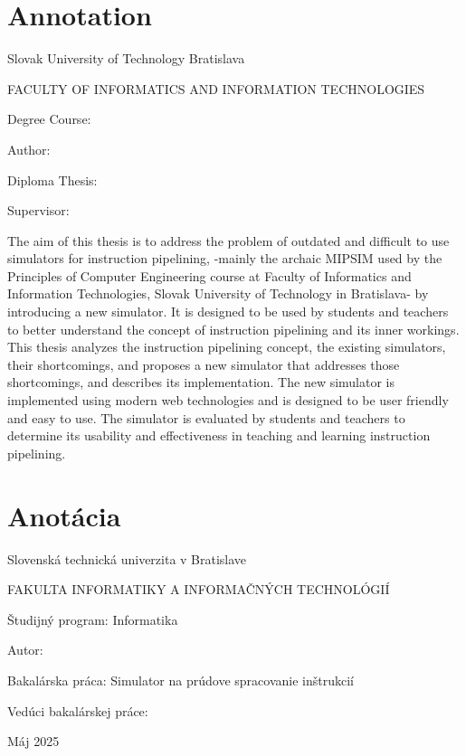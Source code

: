 \thispagestyle{empty}

\section*{Annotation}

\begin{minipage}[t]{1\columnwidth}%
Slovak University of Technology Bratislava 

FACULTY OF INFORMATICS AND INFORMATION TECHNOLOGIES

Degree Course: \myStudyProgram
\newline

Author: \myName

Diploma Thesis: \myTitle

Supervisor: \mySupervisor

\myDate%
\end{minipage}

\bigskip{}

The aim of this thesis is to address the problem of outdated and difficult to use simulators for instruction pipelining, -mainly the archaic MIPSIM used by the Principles of Computer Engineering course at Faculty of Informatics and Information Technologies, Slovak University of Technology in Bratislava- by introducing a new simulator. It is designed to be used by students and teachers to better understand the concept of instruction pipelining and its inner workings. This thesis analyzes the instruction pipelining concept, the existing simulators, their shortcomings, and proposes a new simulator that addresses those shortcomings, and describes its implementation. The new simulator is implemented using modern web technologies and is designed to be user friendly and easy to use. The simulator is evaluated by students and teachers to determine its usability and effectiveness in teaching and learning instruction pipelining.


\newpage{}\thispagestyle{empty}

\newpage
\thispagestyle{empty}
\mbox{}
\newpage

\thispagestyle{empty}
\section*{Anotácia}

\begin{minipage}[t]{1\columnwidth}%
Slovenská technická univerzita v Bratislave

FAKULTA INFORMATIKY A INFORMAČNÝCH TECHNOLÓGIÍ

Študijný program: Informatika
\newline

Autor: \myName

Bakalárska práca: Simulator na prúdove spracovanie inštrukcií

Vedúci bakalárskej práce: \mySupervisor

Máj 2025
\end{minipage}

